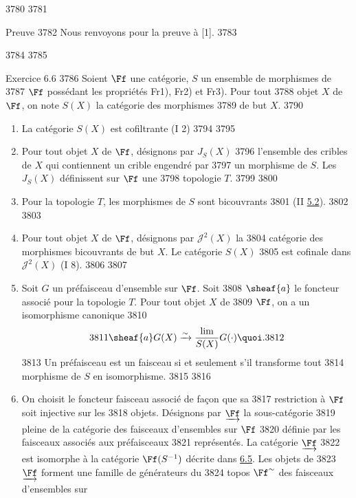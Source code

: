   3780	
  3781	\begin{enonce*}[remark]{Preuve}
  3782	Nous renvoyons pour la preuve à [1].
  3783	\end{enonce*}
  3784	
  3785	\begin{enonce*}[remark]{Exercice 6.6}
  3786	Soient $\Ff$ une catégorie, $S$ un ensemble de morphismes de
  3787	$\Ff$ possédant les propriétés Fr1), Fr2) et Fr3). Pour tout
  3788	objet $X$ de $\Ff$, on note $S(X)$ la catégorie des morphismes
  3789	de but $X$.
  3790	\begin{enumerate}
  3791	\renewcommand{\theenumi}{\alph{enumi}}
  3792	\renewcommand{\labelenumi}{\theenumi)}
  3793	\item La catégorie $S(X)$ est cofiltrante (I 2)
  3794	
  3795	\item Pour tout objet $X$ de $\Ff$, désignons par $J_S(X)$
  3796	  l'ensemble des cribles de $X$ qui contiennent un crible engendré par
  3797	  un morphisme de $S$. Les $J_S(X)$ définissent sur $\Ff$ une
  3798	  topologie $T$.
  3799	
  3800	\item Pour la topologie $T$, les morphismes de $S$ sont bicouvrants
  3801	  (II \hyperref[VI.cor5.2]{5.2}).
  3802	
  3803	\item Pour tout objet $X$ de $\Ff$, désignons par $𝒥^2(X)$ la
  3804	  catégorie des morphismes bicouvrants de but $X$. Le catégorie $S(X)$
  3805	  est cofinale dans $𝒥^2(X)$ (I 8).
  3806	
  3807	\item Soit $G$ un préfaisceau d'ensemble sur $\Ff$. Soit
  3808	  $\sheaf{a}$ le   foncteur associé pour la topologie $T$. Pour tout objet $X$ de
  3809	  $\Ff$, on a un isomorphisme canonique
  3810	$$
  3811	\sheaf{a} G(X) \xrightarrow{\sim} \frac{\lim}{S(X)} G( \cdot ){\quoi}.
  3812	$$
  3813	Un préfaisceau est un faisceau si et seulement s'il transforme tout
  3814	morphisme de $S$ en isomorphisme.
  3815	
  3816	\item On choisit le foncteur faisceau associé de façon que sa
  3817	  restriction à $\Ff$ soit injective sur les
  3818	  objets. Désignons par $\underrightarrow{\Ff}$ la sous-catégorie
  3819	  pleine de la catégorie des faisceaux d'ensembles sur $\Ff$
  3820	  définie par les faisceaux associés aux préfaisceaux
  3821	  représentés. \pageoriginale La   catégorie $\underrightarrow{\Ff}$
  3822	   est isomorphe à la catégorie $\Ff(S^{-1})$ décrite dans \hyperref[VI.prop6.5]{6.5}. Les objets de
  3823	  $\underrightarrow{\Ff}$ forment une famille de générateurs du
  3824	  topos $\Ff^{\sim}$ des faisceaux d'ensembles sur

\end{enumerate}
\end{enonce*}
